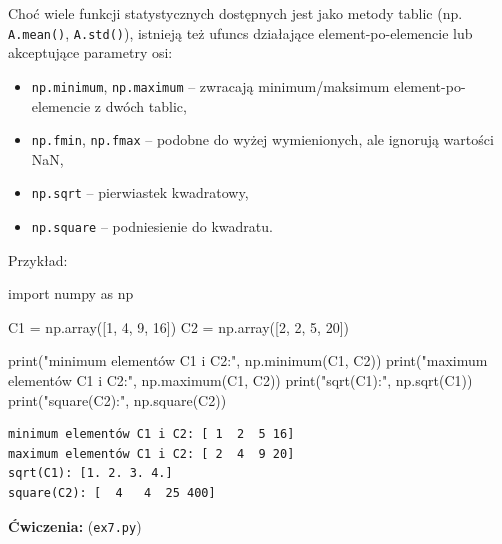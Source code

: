 \documentclass[
  polish,
  letterpaper,
  DIV=11,
  numbers=noendperiod]{scrreprt}
\newenvironment{Shaded}{\begin{snugshade}}{\end{snugshade}}
\newcommand{\BuiltInTok}[1]{\textcolor[rgb]{0.00,0.23,0.31}{#1}}
\newcommand{\DecValTok}[1]{\textcolor[rgb]{0.68,0.00,0.00}{#1}}
\newcommand{\ImportTok}[1]{\textcolor[rgb]{0.00,0.46,0.62}{#1}}
\newcommand{\NormalTok}[1]{\textcolor[rgb]{0.00,0.23,0.31}{#1}}
\newcommand{\OperatorTok}[1]{\textcolor[rgb]{0.37,0.37,0.37}{#1}}
\newcommand{\StringTok}[1]{\textcolor[rgb]{0.13,0.47,0.30}{#1}}
\providecommand{\tightlist}{%
  \setlength{\itemsep}{0pt}\setlength{\parskip}{0pt}}
\begin{document}
Choć wiele funkcji statystycznych dostępnych jest jako metody tablic
(np. \texttt{A.mean()}, \texttt{A.std()}), istnieją też ufuncs
działające element-po-elemencie lub akceptujące parametry osi:

\begin{itemize}
\tightlist
\item
  \texttt{np.minimum}, \texttt{np.maximum} -- zwracają minimum/maksimum
  element-po-elemencie z dwóch tablic,
\item
  \texttt{np.fmin}, \texttt{np.fmax} -- podobne do wyżej wymienionych,
  ale ignorują wartości NaN,
\item
  \texttt{np.sqrt} -- pierwiastek kwadratowy,
\item
  \texttt{np.square} -- podniesienie do kwadratu.
\end{itemize}

Przykład:

\begin{Shaded}
\begin{Highlighting}[]
\ImportTok{import}\NormalTok{ numpy }\ImportTok{as}\NormalTok{ np}

\NormalTok{C1 }\OperatorTok{=}\NormalTok{ np.array([}\DecValTok{1}\NormalTok{, }\DecValTok{4}\NormalTok{, }\DecValTok{9}\NormalTok{, }\DecValTok{16}\NormalTok{])}
\NormalTok{C2 }\OperatorTok{=}\NormalTok{ np.array([}\DecValTok{2}\NormalTok{, }\DecValTok{2}\NormalTok{, }\DecValTok{5}\NormalTok{, }\DecValTok{20}\NormalTok{])}

\BuiltInTok{print}\NormalTok{(}\StringTok{"minimum elementów C1 i C2:"}\NormalTok{, np.minimum(C1, C2))}
\BuiltInTok{print}\NormalTok{(}\StringTok{"maximum elementów C1 i C2:"}\NormalTok{, np.maximum(C1, C2))}
\BuiltInTok{print}\NormalTok{(}\StringTok{"sqrt(C1):"}\NormalTok{, np.sqrt(C1))}
\BuiltInTok{print}\NormalTok{(}\StringTok{"square(C2):"}\NormalTok{, np.square(C2))}
\end{Highlighting}
\end{Shaded}

\begin{verbatim}
minimum elementów C1 i C2: [ 1  2  5 16]
maximum elementów C1 i C2: [ 2  4  9 20]
sqrt(C1): [1. 2. 3. 4.]
square(C2): [  4   4  25 400]
\end{verbatim}

\textbf{Ćwiczenia:} (\texttt{ex7.py})
\end{document}

